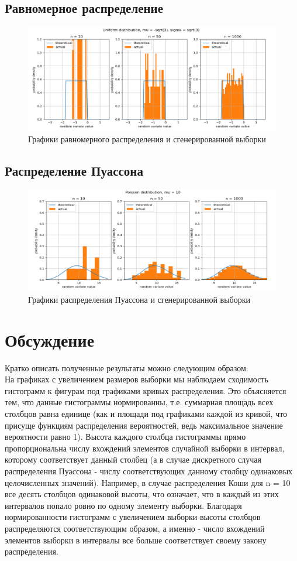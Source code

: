 \documentclass[12pt,a4paper]{article}
\begin{document}
	\subsection{Равномерное распределение}
		\begin{figure}[h]
			\centering
			\includegraphics[width=\linewidth]{MS1res/uniform.png}
			\caption{Графики равномерного распределения и сгенерированной выборки}
		\end{figure}
	\newpage
	\subsection{Распределение Пуассона}
		\begin{figure}[h]
			\centering
			\includegraphics[width=\linewidth]{MS1res/poisson.png}
			\caption{Графики распределения Пуассона и сгенерированной выборки}
		\end{figure}
	\section{Обсуждение}
	Кратко описать полученные результаты можно следующим образом:\\
	На графиках с увеличением размеров выборки мы наблюдаем сходимость гистограмм к фигурам под графиками кривых распределения. Это объясняется тем, что данные гистограммы нормированны, т.е. суммарная площадь всех столбцов равна единице (как и площади под графиками каждой из кривой, что присуще функциям распределения вероятностей, ведь максимальное значение вероятности равно 1). Высота каждого столбца гистограммы прямо пропорциональна числу вхождений элементов случайной выборки в интервал, которому соответствует данный столбец (а в случае дискретного случая распределения Пуассона - числу соответствующих данному столбцу одинаковых целочисленных значений). Например, в случае распределения Коши для n = 10 все десять столбцов одинаковой высоты, что означает, что в каждый из этих интервалов попало ровно по одному элементу выборки. Благодаря нормированности гистограмм с увеличением выборки высоты столбцов распределяются соответствующим образом, а именно - число вхождений элементов выборки в интервалы все больше соответствует своему закону распределения.
\end{document}

